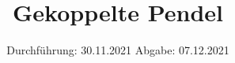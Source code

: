 

\subject{V106}
\title{Gekoppelte Pendel}
\date{%
  Durchführung: 30.11.2021
  \hspace{3em}
  Abgabe: 07.12.2021
}



\maketitle
\thispagestyle{empty}
\tableofcontents
\newpage






\printbibliography{}




